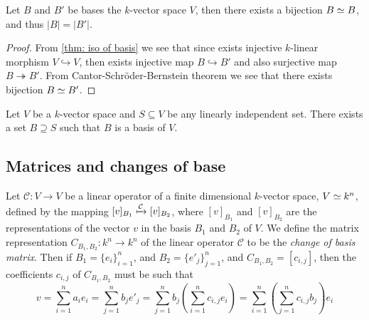\begin{lemma}
  Let \(B\) and \(B'\) be bases the \(k\)-vector space \(V\), then there exists
  a bijection \(B \simeq B\), and thus \(|B| = |B'|\).
\end{lemma}

\begin{proof}
  From \cref{thm: iso of basis} we see that since exists injective
  \(k\)-linear morphism \(V \hookrightarrow V\), then exists injective map \(B
  \hookrightarrow B'\) and also surjective map \(B \twoheadrightarrow B'\). From
  Cantor-Schröder-Bernstein theorem we see that there exists bijection \(B \simeq
  B'\).
\end{proof}

\begin{proposition}\label{prop: li to basis}
  Let \(V\) be a \(k\)-vector space and \(S \subseteq V\) be any linearly
  independent set. There exists a set \(B \supseteq S\) such that \(B\) is a
  basis of \(V\).
\end{proposition}


\subsection{Matrices and changes of base}

\begin{definition}
  \label{def: change of basis matrix}
  Let \(\mathcal C : V \to V\) be a linear operator of a finite dimensional
  \(k\)-vector space, \(V \simeq k^n\), defined by the mapping \([v]_{B_1}
  \xmapsto{\mathcal C} [v]_{B_2}\), where \([v]_{B_1}\) and \([v]_{B_2}\) are the
  representations of the vector \(v\) in the basis \(B_1\) and \(B_2\) of \(V\).
  We define the matrix representation \(C_{B_1, B_2} : k^n \to k^n\) of the
  linear operator \(\mathcal C\) to be the \emph{change of basis matrix}. Then
  if \(B_1 = \{e_i\}_{i=1}^n\), and \(B_2 = \{e'_j\}_{j=1}^n\), and \(C_{B_1,
  B_2} = [c_{i, j}]\), then the coefficients \(c_{i, j}\) of \(C_{B_1, B_2}\)
  must be such that
  \[
    v = \sum_{i=1}^n a_i e_i = \sum_{j=1}^n b_j e'_j
    = \sum_{j=1}^n b_j \left( \sum_{i=1}^n c_{i, j} e_i \right)
    = \sum_{i=1}^n \left( \sum_{j=1}^n c_{i, j} b_j \right) e_i
  \]
\end{definition}

